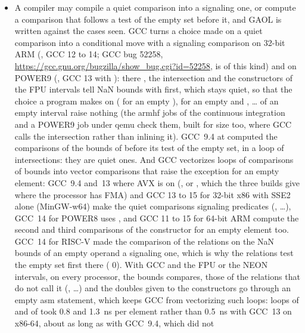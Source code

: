 \begin{itemize}
  double before they know it is no NaN.\newinvfive
\item A compiler may compile a quiet comparison into a signaling one, or
  compute a comparison that follows a test of the empty set before it, and
  GAOL is written against the cases seen. GCC turns a choice made on a quiet
  comparison into a conditional move with a signaling comparison on 32-bit
  ARM (, GCC 12 to 14; GCC bug 52258,
  \url{https://gcc.gnu.org/bugzilla/show_bug.cgi?id=52258}, is of this kind)
  and on POWER9 (, GCC 13 with ): there
  , the intersection and the constructors of the FPU
  intervals tell NaN bounds with  first, which stays
  quiet, so that the choice a program makes on 
  ( for an empty ),  for an
  empty  and , \dots{} of an empty interval
  raise nothing (the armhf jobs of the continuous integration and a POWER9
  job under qemu check them, built for size too, where GCC calls the
  intersection rather than inlining it). GCC~9.4 at  computed the
  comparisons of the bounds of  before its test of the empty
  set, in a loop of intersections: they are quiet ones. And GCC vectorizes
  loops of comparisons of bounds into vector comparisons that raise the
  exception for an empty element: GCC~9.4 and~13 where AVX is on
  (, or , which the three builds give where the
  processor has FMA) and GCC 13 to 15 for 32-bit x86 with SSE2 alone
  (MinGW-w64) make the quiet comparisons signaling predicates
  (, \dots), GCC~14 for POWER8 uses
  , and GCC 11 to 15 for 64-bit ARM compute the second and
  third comparisons of the constructor for an empty element too. GCC~14 for
RISC-V made the comparison of the relations on the NaN bounds of an empty
operand a signaling one, which is why the relations test the empty set first
there ( 0). With GCC and
  the FPU or the NEON intervals, on every processor, the bounds
   compares, those of the relations that do not call it
  (, \dots) and the doubles
  given to the constructors go through an empty asm statement, which keeps
  GCC from vectorizing such loops: loops of  and of
   took 0.8 and 1.3~ns per element rather than
  0.5~ns with GCC~13 on x86-64, about as long as with GCC~9.4, which did not

\end{itemize}
